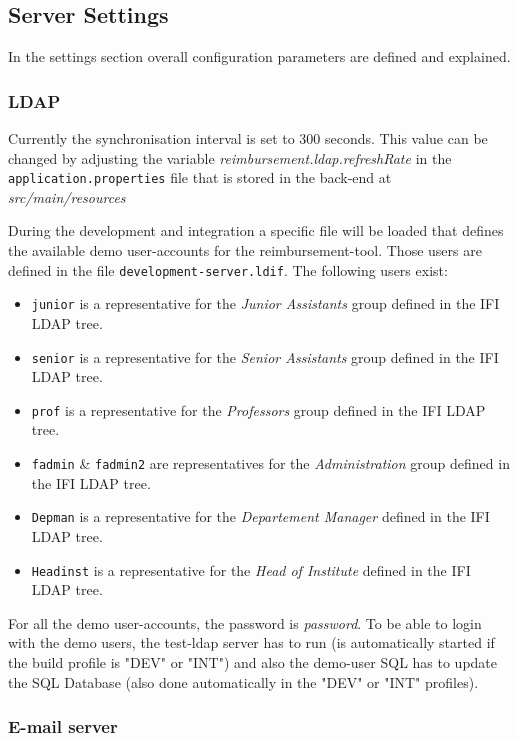 \subsection{Server Settings}
In the settings section overall configuration parameters are defined and explained.

\subsubsection{LDAP}
\label{subsubsec:ldap}

Currently the synchronisation interval is set to 300 seconds. This value can be changed by adjusting the variable \textit{reimbursement.ldap.refreshRate} in the \texttt{application.properties} file that is stored in the back-end at \textit{src/main/resources} \par
During the development and integration a specific file will be loaded that defines the available demo user-accounts for the reimbursement-tool. Those users are defined in the file \texttt{development-server.ldif}. The following users exist:
\begin{itemize}
\item \texttt{junior} is a representative for the \textit{Junior Assistants} group defined in the IFI LDAP tree.
\item \texttt{senior} is a representative for the \textit{Senior Assistants} group defined in the IFI LDAP tree.
\item \texttt{prof} is a representative for the \textit{Professors} group defined in the IFI LDAP tree.
\item \texttt{fadmin} \& \texttt{fadmin2} are representatives for the \textit{Administration} group defined in the IFI LDAP tree.
\item \texttt{Depman} is a representative for the \textit{Departement Manager} defined in the IFI LDAP tree.
\item \texttt{Headinst} is a representative for the \textit{Head of Institute} defined in the IFI LDAP tree.

\end{itemize}

For all the demo user-accounts, the password is \textit{password}. To be able to login with the demo users, the test-ldap server has to run (is automatically started if the build profile is "DEV" or "INT") and also the demo-user SQL has to update the SQL Database (also done automatically in the "DEV" or "INT" profiles).

\subsubsection{E-mail server}
\label{subsubsec:e-mail}

